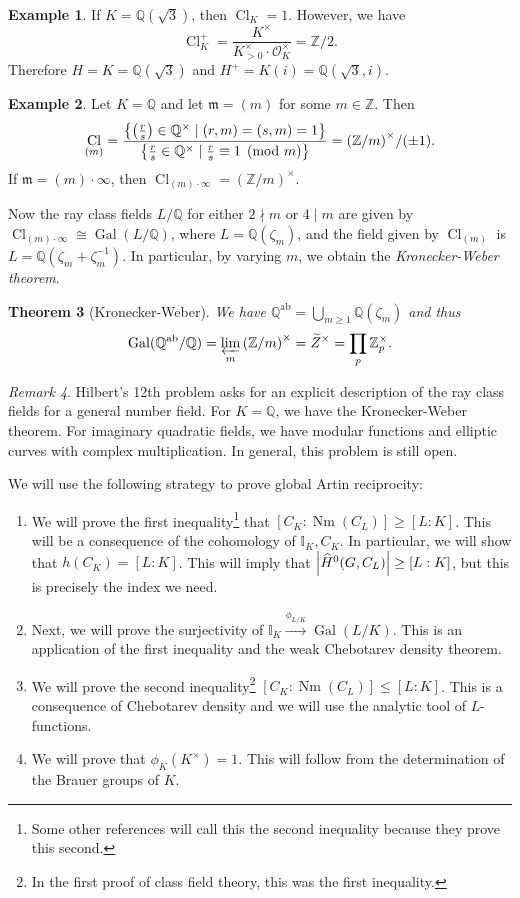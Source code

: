 \documentclass[leqno, openany]{memoir}
\newtheorem{thm}{Theorem}[section]
\theoremstyle{definition}
\newtheorem{exm}[thm]{Example}
\theoremstyle{remark}
\newtheorem{rmk}[thm]{Remark}
\theoremstyle{plain}
\theoremstyle{definition}
\theoremstyle{remark}
\newcommand{\Z}{\mathbb{Z}}
\newcommand{\Q}{\mathbb{Q}}
\newcommand{\I}{\mathbb{I}}
\newcommand{\mc}[1]{\mathcal{#1}}
\newcommand{\mf}[1]{\mathfrak{#1}}
\newcommand{\mr}[1]{\mathrm{#1}}
\newcommand{\wt}[1]{\widetilde{#1}}
\newcommand{\wh}[1]{\widehat{#1}}
\DeclareMathOperator{\Gal}{Gal}
\DeclareMathOperator{\Cl}{Cl}
\DeclareMathOperator{\Nm}{Nm}
\begin{document}
\begin{exm}
    If $K = \Q(\sqrt{3})$, then $\Cl_K = \qty{1}$. However, we have
    \[ \Cl_K^+ = \frac{K^{\times}}{K_{>0}^{\times} \cdot \mc{O}_K^{\times}} = \Z/2. \]
    Therefore $H = K = \Q(\sqrt{3})$ and $H^+ = K(i) = \Q(\sqrt{3}, i)$.
\end{exm}

\begin{exm}
    Let $K = \Q$ and let $\mf{m} = (m)$ for some $m \in \Z$. Then
    \[ \Cl_{(m)} = \frac{\qty{\qty(\frac{r}{s}) \in \Q^{\times} \mid (r,m) = (s,m) = 1}}{\qty{\frac{r}{s} \in \Q^{\times} \mid \frac{r}{s} \equiv 1 \pmod m}} = {(\Z/m)}^{\times} / (\pm 1). \]
    If $\mf{m} = (m) \cdot \infty$, then $\Cl_{(m) \cdot \infty} = {(\Z/m)}^{\times}$.

    Now the ray class fields $L/\Q$ for either $2 \nmid m$ or $4 \mid m$ are given by $\Cl_{(m) \cdot \infty} \cong \Gal(L/\Q)$, where $L = \Q(\zeta_m)$, and the field given by $\Cl_{(m)}$ is $L = \Q(\zeta_m + \zeta_m^{-1})$. In particular, by varying $m$, we obtain the \textit{Kronecker-Weber theorem}. 
\end{exm}

\begin{thm}[Kronecker-Weber]
    We have $\Q^{\mr{ab}} = \bigcup_{m \geq 1} \Q(\zeta_m)$ and thus 
    \[ \Gal(\Q^{\mr{ab}}/\Q) = \varprojlim_m {(\Z/m)}^{\times} = \wt{Z}^{\times} = \prod_p \Z_p^{\times}. \]
\end{thm}

\begin{rmk}
    Hilbert's 12th problem asks for an explicit description of the ray class fields for a general number field. For $K = \Q$, we have the Kronecker-Weber theorem. For imaginary quadratic fields, we have modular functions and elliptic curves with complex multiplication. In general, this problem is still open.
\end{rmk}

We will use the following strategy to prove global Artin reciprocity:
\begin{enumerate}
    \item We will prove the first inequality\footnote{Some other references will call this the second inequality because they prove this second.} that $[C_K:\Nm(C_L)] \geq [L:K]$. This will be a consequence of the cohomology of $\I_K, C_K$. In particular, we will show that $h(C_K) = [L:K]$. This will imply that $\abs{\wh{H}^0(G, C_L)} \geq [L:K]$, but this is precisely the index we need.
    \item Next, we will prove the surjectivity of $\I_K \xrightarrow{\phi_{L/K}} \Gal(L/K)$. This is an application of the first inequality and the weak Chebotarev density theorem.
    \item We will prove the second inequality\footnote{In the first proof of class field theory, this was the first inequality.} $[C_K : \Nm(C_L)] \leq [L:K]$. This is a consequence of Chebotarev density and we will use the analytic tool of $L$-functions.
    \item We will prove that $\phi_K(K^{\times}) = 1$. This will follow from the determination of the Brauer groups of $K$.
\end{enumerate}
\end{document}
